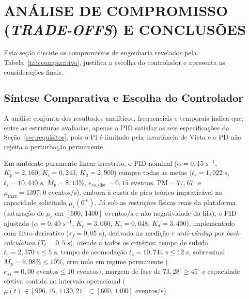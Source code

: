 \section{ANÁLISE DE COMPROMISSO (\textit{TRADE-OFFS}) E CONCLUSÕES}\label{sec:conclusoes}

Esta seção discute os compromissos de engenharia revelados pela Tabela~\ref{tab:comparativo}, justifica a escolha do controlador e apresenta as considerações finais.

\subsection{Síntese Comparativa e Escolha do Controlador}\label{sec:escolha_otima}
A análise conjunta dos resultados analíticos, frequenciais e temporais indica que, entre as estruturas avaliadas, apenas a PID satisfaz as seis especificações da Seção~\ref{sec:requisitos}, pois o PI é limitado pela invariância de Vieta e o PD não rejeita a perturbação permanente.

Em ambiente puramente linear irrestrito, o PID nominal ($\alpha = 0{,}15\text{ s}^{-1}$, $K_p=2{,}160$, $K_i=0{,}243$, $K_d=2{,}900$) cumpre todas as metas ($t_r=1{,}022\text{ s}$, $t_s=10{,}440\text{ s}$, $M_p=8{,}13\%$, $e_{ss,\text{dist}}=0{,}15\text{ eventos}$, $\mathrm{PM}=77{,}67^\circ$ e $\mu_{\max}=1397{,}0\text{ eventos/s}$), embora à custa de pico teórico impraticável na capacidade solicitada $\mu_c(0^+)$. Já sob as restrições físicas reais da plataforma (saturação de $\mu_c$ em $[600,\,1400]\text{ eventos/s}$ e não negatividade da fila), o PID ajustado ($\alpha = 0{,}40\text{ s}^{-1}$, $K_p=3{,}060$, $K_i=0{,}648$, $K_d=3{,}400$), implementado com filtro derivativo ($\tau_f = 0{,}05\text{ s}$), derivada na medição e \textit{anti-windup} por \textit{back-calculation} ($T_t = 0{,}5\text{ s}$), atende a todos os critérios: tempo de subida $t_r = 2{,}370\text{ s} \le 5\text{ s}$, tempo de acomodação $t_s = 10{,}744\text{ s} \le 12\text{ s}$, sobressinal $M_p = 6{,}98\% \le 10\%$, erro nulo em regime permanente ($e_{ss} = 0{,}00\text{ eventos} \le 10\text{ eventos}$), margem de fase de $73{,}28^\circ \ge 45^\circ$ e capacidade efetiva contida no intervalo operacional ($\mu(t) \in [996{,}15,\,1130{,}21] \subset [600,\,1400]\text{ eventos/s}$).

